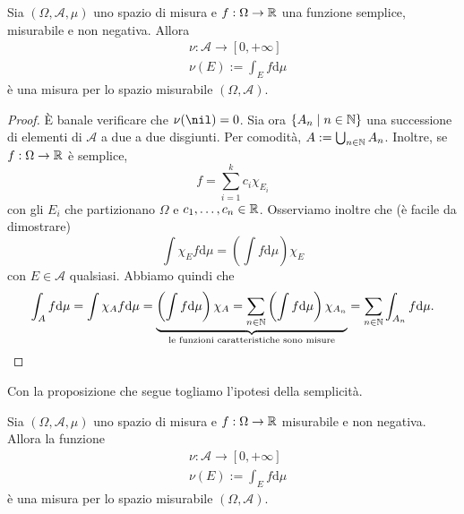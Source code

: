 
\begin{lemma}
Sia \((\Omega, \mathcal A, \mu)\) uno spazio di misura e \(f : \Omega \to \mathbb R\) una funzione semplice, misurabile e non negativa. Allora
\begin{align*}
& \nu : \mathcal A \to [0, +\infty] \\
& \nu(E) := \int_E f \mathrm d \mu
\end{align*}
è una misura per lo spazio misurabile \((\Omega, \mathcal A)\).
\end{lemma}

\begin{proof}
È banale verificare che \(\nu(\nil) = 0\). Sia ora \(\left\{A_n \mid n \in \mathbb N\right\}\) una successione di elementi di \(\mathcal A\) a due a due disgiunti. Per comodità, \(A := \bigcup_{n \in \mathbb N} A_n\). Inoltre, se \(f : \Omega \to \mathbb R\) è semplice,
\[f = \sum_{i=1}^k c_i \chi_{E_i}\]
con gli \(E_i\) che partizionano \(\Omega\) e \(c_1, \dots{}, c_n \in \mathbb R\). Osserviamo inoltre che (è facile da dimostrare)
\[\int \chi_E f \mathrm d \mu = \left(\int f \mathrm d \mu\right) \chi_E\]
con \(E \in \mathcal A\) qualsiasi. Abbiamo quindi che
\[\int_A f \mathrm d \mu = \int \chi_A f \mathrm d \mu = \underbrace{\left(\int f \mathrm d \mu\right) \chi_A = \sum_{n \in \mathbb N} \left(\int f \mathrm d \mu\right) \chi_{A_n}}_{\text{le funzioni caratteristiche sono misure}} = \sum_{n \in \mathbb N} \int_{A_n} f \mathrm d\mu. \qedhere\]
\end{proof}

Con la proposizione che segue togliamo l'ipotesi della semplicità.

\begin{proposizione}
Sia \((\Omega, \mathcal A, \mu)\) uno spazio di misura e \(f : \Omega \to \mathbb R\) misurabile e non negativa. Allora la funzione
\begin{align*}
& \nu : \mathcal A \to [0, +\infty] \\
& \nu(E) := \int_E f \mathrm d \mu
\end{align*}
è una misura per lo spazio misurabile \((\Omega, \mathcal A)\).
\end{proposizione}

